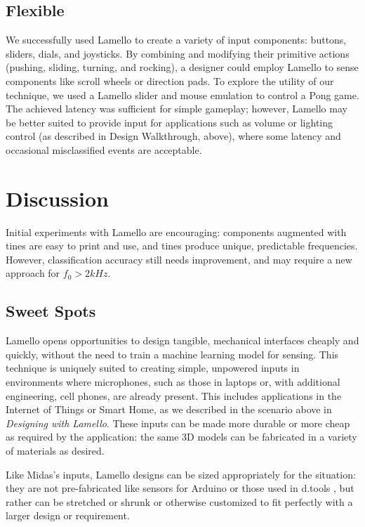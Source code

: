     \subsection{Flexible}
    We successfully used Lamello to create a variety of input components: buttons, sliders, dials, and joysticks. By combining and modifying their primitive actions (pushing, sliding, turning, and rocking), a designer could employ Lamello to sense components like scroll wheels or direction pads. 
    To explore the utility of our technique, we used a Lamello slider and mouse emulation to control a Pong game. The achieved latency was sufficient for simple gameplay; however, Lamello may be better suited to provide input for applications such as volume or lighting control (as described in Design Walkthrough, above), where some latency and occasional misclassified events are acceptable.

\section{Discussion}

Initial experiments with Lamello are encouraging: components augmented with tines are easy to print and use, and tines produce unique, predictable frequencies. However, classification accuracy still needs improvement, and may require a new approach for $f_0>2kHz$.

    \subsection{Sweet Spots}

    Lamello opens opportunities to design tangible, mechanical interfaces cheaply and quickly, without the need to train a machine learning model for sensing. This technique is uniquely suited to creating simple, unpowered inputs in environments where microphones, such as those in laptops or, with additional engineering, cell phones, are already present. This includes applications in the Internet of Things or Smart Home, as we described in the scenario above in \emph{Designing with Lamello}. These inputs can be made more durable or more cheap as required by the application: the same 3D models can be fabricated in a variety of materials as desired.
    
    Like Midas's inputs, Lamello designs can be sized appropriately for the situation: they are not pre-fabricated like sensors for Arduino \cite{arduino} or those used in d.tools \cite{hartmann-dtools}, but rather can be stretched or shrunk or otherwise customized to fit perfectly with a larger design or requirement.
    
